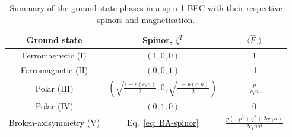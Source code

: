 \begin{table}
    \centering
    \begin{tabular}{ccc}
        \toprule
        Ground state & Spinor, \(\zeta^T\) & \(\langle\hat{F}_z\rangle\) \\
        \midrule
        Ferromagnetic (I) & \((1, 0, 0)\) & 1 \\
        Ferromagnetic (II) & \((0, 0, 1)\) & -1 \\
        Polar (III) & \(\left(\sqrt{\frac{1 + p(c_1n)}{2}}, 0,
        \sqrt{\frac{1 - p(c_1n)}{2}}\right)\) & \(\frac{p}{c_1n}\) \\
        Polar (IV) & \((0, 1, 0)\) & 0 \\
        Broken-axisymmetry (V) & Eq.~\eqref{eq: BA-spinor} &
        \(\frac{p(-p^2+q^2+2qc_1n)}{2c_1nq^2}\) \\
        \bottomrule
    \end{tabular}
    \caption[Ground states arising in spin-1 BECs in the presence of magnetic
    fields]
    {\label{tab: spin-1-ground-states}Summary of the ground state phases in a
    spin-1 BEC with their respective spinors and magnetisation.}
\end{table}

